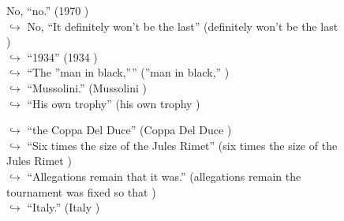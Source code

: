\documentclass[11pt,a4paper, onecolumn]{article}
\begin{document}
\begin{figure}[t]
\begin{tcolorbox}[boxsep=0pt,left=5pt,right=0pt,top=2pt,colback = yellow!5]
\begin{dialogue}
\colorbox{red!25}{No,}
{ ``no.'' (1970 ) }
\\
\colorbox{pink!25}{$\hookrightarrow$}
\colorbox{red!25}{No,}
{ ``It definitely won't be the last'' (definitely won't be the last ) }
\\
\colorbox{pink!25}{$\hookrightarrow$}
{ ``1934'' (1934 ) }
\\
\colorbox{pink!25}{$\hookrightarrow$}
{ ``The ''man in black,'''' (''man in black,'' ) }
\\
\colorbox{pink!25}{$\hookrightarrow$}
{ ``Mussolini.'' (Mussolini ) }
\\
\colorbox{pink!25}{$\hookrightarrow$}
{ ``His own trophy'' (his own trophy ) }
 \end{dialogue}\end{tcolorbox}\end{figure}\begin{figure}[t] \small \begin{tcolorbox}[boxsep=0pt,left=5pt,right=0pt,top=2pt,colback = yellow!5] \begin{dialogue}
 \small 
\colorbox{pink!25}{$\hookrightarrow$}
{ ``the Coppa Del Duce'' (Coppa Del Duce ) }
\\
\colorbox{pink!25}{$\hookrightarrow$}
{ ``Six times the size of the Jules Rimet'' (six times the size of the Jules Rimet ) }
\\
\colorbox{pink!25}{$\hookrightarrow$}
{ ``Allegations remain that it was.'' (allegations remain the tournament was fixed so that ) }
\\
\colorbox{pink!25}{$\hookrightarrow$}
{ ``Italy.'' (Italy ) }
\\
 \end{dialogue}\end{tcolorbox}\end{figure}
\end{document}
